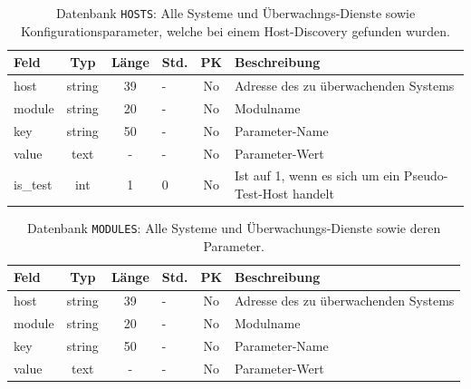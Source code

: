 \begin{table}[H]
\centering
\begin{tabular}{l|c|c|l|c|p{8cm}}
 \toprule
 Feld & Typ & L\"ange & Std. & PK & Beschreibung\\
 \midrule
 host & string & 39 & - & No & Adresse des zu \"uberwachenden Systems\\
 \midrule
 module & string & 20 & - & No & Modulname\\
 \midrule
 key & string & 50 & - & No & Parameter-Name\\
 \midrule
 value & text & - & - & No & Parameter-Wert\\
 \midrule
 is\_test & int & 1 & 0 & No & Ist auf 1, wenn es sich um ein Pseudo-Test-Host handelt\\
 \bottomrule
\end{tabular}
\caption[Datenbank-Tabelle: HOSTS]{Datenbank \texttt{HOSTS}: Alle Systeme und \"Uberwachngs-Dienste sowie Konfigurationsparameter, welche bei einem Host-Discovery gefunden wurden.}
\label{tbl:praxis-basis-data-table_hosts}
\end{table}

\begin{table}[H]
\centering
\begin{tabular}{l|c|c|l|c|p{8cm}}
 \toprule
 Feld & Typ & L\"ange & Std. & PK & Beschreibung\\
 \midrule
 host & string & 39 & - & No & Adresse des zu \"uberwachenden Systems\\
 \midrule
 module & string & 20 & - & No & Modulname\\
 \midrule
 key & string & 50 & - & No & Parameter-Name\\
 \midrule
 value & text & - & - & No & Parameter-Wert\\
 \bottomrule
\end{tabular}
\caption[Datenbank-Tabelle: MODULES]{Datenbank \texttt{MODULES}: Alle Systeme und \"Uberwachungs-Dienste sowie deren Parameter.}
\label{tbl:praxis-basis-data-table_modules}
\end{table}

